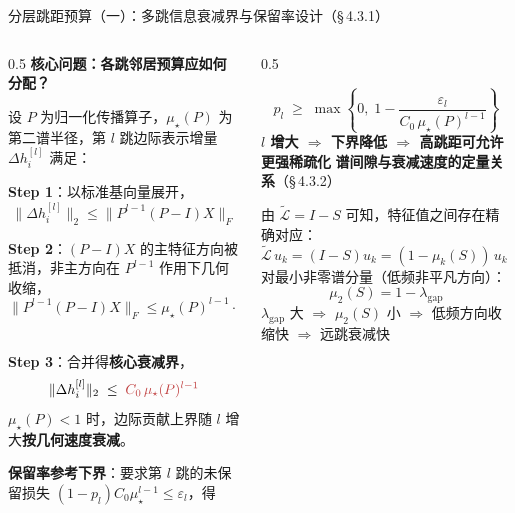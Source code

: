 \documentclass[aspectratio=169,9pt,xcolor=dvipsnames]{beamer}
\newcommand{\highlight}[1]{\textcolor{myred}{\textbf{#1}}}
\newcommand{\blue}[1]{\textcolor{mynavy}{#1}}
\begin{document}
\begin{frame}{分层跳距预算（一）：多跳信息衰减界与保留率设计（§\,4.3.1）}
\begin{columns}[T]

\begin{column}{0.5\textwidth}
  \textbf{\blue{核心问题：各跳邻居预算应如何分配？}}

  设 $P$ 为归一化传播算子，$\mu_\star(P)$ 为第二谱半径，第 $l$ 跳边际表示增量 $\Delta h_i^{[l]}$ 满足：

  \textbf{Step 1}：以标准基向量展开，
  \begin{equation*}
    \|\Delta h_i^{[l]}\|_2 \le \|P^{l-1}(P-I)X\|_F
  \end{equation*}

  \textbf{Step 2}：$(P-I)X$ 的主特征方向被抵消，非主方向在 $P^{l-1}$ 作用下几何收缩，
  \begin{equation*}
    \|P^{l-1}(P-I)X\|_F \le \mu_\star(P)^{l-1}\cdot\underbrace{\|(P-I)X\|_F}_{C_0}
  \end{equation*}
  \vspace{-0.7cm}

  \textbf{Step 3}：合并得\textbf{核心衰减界}，
  \begin{equation*}
    \|\Delta h_i^{[l]}\|_2 \;\le\; {\color{myred}C_0\,\mu_\star(P)^{l-1}}
  \end{equation*}
  $\mu_\star(P)<1$ 时，边际贡献上界随 $l$ 增大\textbf{按几何速度衰减}。

  \smallskip
  \textbf{保留率参考下界}：要求第 $l$ 跳的未保留损失 $(1-p_l)C_0\mu_\star^{l-1}\le\varepsilon_l$，得
\end{column}

\begin{column}{0.5\textwidth}

  \begin{equation*}
    p_l \;\geq\; \max\!\left\{0,\;1 - \frac{\varepsilon_l}{C_0\,\mu_\star(P)^{l-1}}\right\}
  \end{equation*}
  \highlight{$l$ 增大 $\Rightarrow$ 下界降低 $\Rightarrow$ 高跳距可允许更强稀疏化}
\smallskip
\textbf{\blue{谱间隙与衰减速度的定量关系}}（§\,4.3.2）

  由 $\tilde{\mathcal{L}}=I-S$ 可知，特征值之间存在精确对应：
  \begin{equation*}
    \tilde{\mathcal{L}}\,u_k=(I-S)u_k=(1-\mu_k(S))\,u_k
    \;\Rightarrow\;
    \lambda_k=1-\mu_k(S)
  \end{equation*}
  对最小非零谱分量（低频非平凡方向）：
  \begin{equation*}
    \mu_2(S)=1-\lambda_{\mathrm{gap}}
  \end{equation*}
  $\lambda_{\mathrm{gap}}$ 大 $\Rightarrow$ $\mu_2(S)$ 小 $\Rightarrow$ 低频方向收缩快 $\Rightarrow$ 远跳衰减快


\end{column}
\end{columns}
\end{frame}
\end{document}
